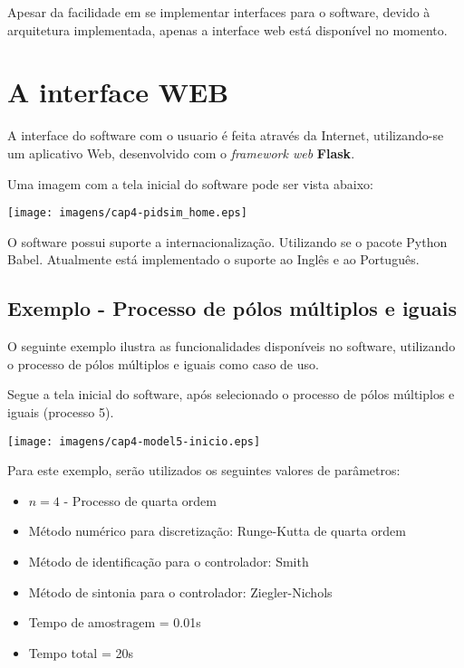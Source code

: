             Apesar da facilidade em se implementar interfaces para o software, devido à arquitetura
            implementada, apenas a interface web está disponível no momento.

\section{A interface WEB}

    A interface do software com o usuario é feita através da Internet, utilizando-se um aplicativo Web,
    desenvolvido com o \textit{framework web} \textbf{Flask}.

    Uma imagem com a tela inicial do software pode ser vista abaixo:
    
    \begin{center}
        \texttt{[image: imagens/cap4-pidsim\_home.eps]}
    \end{center}

    O software possui suporte a internacionalização. Utilizando se o pacote Python Babel. Atualmente está
    implementado o suporte ao Inglês e ao Português.
    
    \subsection{Exemplo - Processo de pólos múltiplos e iguais}
    
        O seguinte exemplo ilustra as funcionalidades disponíveis no software,
        utilizando o processo de pólos múltiplos e iguais como caso de uso.
        
        Segue a tela inicial do software, após selecionado o processo de
        pólos múltiplos e iguais (processo 5).
        
        \begin{center}
            \texttt{[image: imagens/cap4-model5-inicio.eps]}
        \end{center}
        
        Para este exemplo, serão utilizados os seguintes valores de parâmetros:
        
        \begin{itemize}
            \item $n = 4$ - Processo de quarta ordem
            \item Método numérico para discretização: Runge-Kutta de quarta ordem
            \item Método de identificação para o controlador: Smith
            \item Método de sintonia para o controlador: Ziegler-Nichols
            \item Tempo de amostragem = 0.01s
            \item Tempo total = 20s
        \end{itemize}
        
